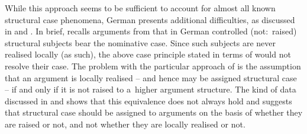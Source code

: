\documentclass[output=paper]{langsci/langscibook}
\begin{document}
While this approach seems to be sufficient to account for almost all known structural case phenomena, German presents additional difficulties, as discussed in \citealt{Mueller97d,Mueller2001a-cr} and \citealt{Meurers99c,Meurers99b}.  In brief, \citet{Mueller97d,Mueller2001a-cr} recalls arguments from \citealt{Hoehle83a,HoehleTopo} that in German controlled (not:~raised) structural subjects bear the nominative case.  Since such subjects are never realised locally (as such), the above case principle stated in terms of  would not resolve their case.  The problem with the particular approach of \citealt{prze:96,Prze99,Prze99b} is the assumption that an argument is locally realised – and hence may be assigned structural case – if and only if it is not raised to a~higher argument structure.  The kind of data discussed in \citealt{Hoehle83a,HoehleTopo} and \citealt{Mueller97d,Mueller2001a-cr} shows that this equivalence does not always hold and suggests that structural case should be assigned to arguments on the basis of whether they are raised or not, and not whether they are locally realised or not.
\end{document}
